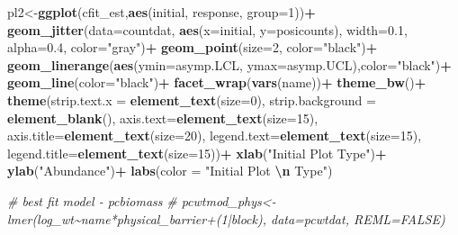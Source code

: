 \documentclass[
]{article}
\newenvironment{Shaded}{\begin{snugshade}}{\end{snugshade}}
\newcommand{\AttributeTok}[1]{\textcolor[rgb]{0.13,0.29,0.53}{#1}}
\newcommand{\CommentTok}[1]{\textcolor[rgb]{0.56,0.35,0.01}{\textit{#1}}}
\newcommand{\DecValTok}[1]{\textcolor[rgb]{0.00,0.00,0.81}{#1}}
\newcommand{\FloatTok}[1]{\textcolor[rgb]{0.00,0.00,0.81}{#1}}
\newcommand{\FunctionTok}[1]{\textcolor[rgb]{0.13,0.29,0.53}{\textbf{#1}}}
\newcommand{\NormalTok}[1]{#1}
\newcommand{\OtherTok}[1]{\textcolor[rgb]{0.56,0.35,0.01}{#1}}
\newcommand{\SpecialCharTok}[1]{\textcolor[rgb]{0.81,0.36,0.00}{\textbf{#1}}}
\newcommand{\StringTok}[1]{\textcolor[rgb]{0.31,0.60,0.02}{#1}}
\begin{document}
\begin{Shaded}
\begin{Highlighting}[]
\NormalTok{pl2}\OtherTok{\textless{}{-}}\FunctionTok{ggplot}\NormalTok{(cfit\_est,}\FunctionTok{aes}\NormalTok{(initial, response, }\AttributeTok{group=}\DecValTok{1}\NormalTok{))}\SpecialCharTok{+}
  \FunctionTok{geom\_jitter}\NormalTok{(}\AttributeTok{data=}\NormalTok{countdat,}
              \FunctionTok{aes}\NormalTok{(}\AttributeTok{x=}\NormalTok{initial, }\AttributeTok{y=}\NormalTok{posicounts),}
              \AttributeTok{width=}\FloatTok{0.1}\NormalTok{,}
              \AttributeTok{alpha=}\FloatTok{0.4}\NormalTok{,}
              \AttributeTok{color=}\StringTok{"gray"}\NormalTok{)}\SpecialCharTok{+}
  \FunctionTok{geom\_point}\NormalTok{(}\AttributeTok{size=}\DecValTok{2}\NormalTok{, }\AttributeTok{color=}\StringTok{"black"}\NormalTok{)}\SpecialCharTok{+}
  \FunctionTok{geom\_linerange}\NormalTok{(}\FunctionTok{aes}\NormalTok{(}\AttributeTok{ymin=}\NormalTok{asymp.LCL, }\AttributeTok{ymax=}\NormalTok{asymp.UCL),}\AttributeTok{color=}\StringTok{"black"}\NormalTok{)}\SpecialCharTok{+}
  \FunctionTok{geom\_line}\NormalTok{(}\AttributeTok{color=}\StringTok{"black"}\NormalTok{)}\SpecialCharTok{+}
  \FunctionTok{facet\_wrap}\NormalTok{(}\FunctionTok{vars}\NormalTok{(name))}\SpecialCharTok{+}
  \FunctionTok{theme\_bw}\NormalTok{()}\SpecialCharTok{+}
  \FunctionTok{theme}\NormalTok{(}\AttributeTok{strip.text.x =} \FunctionTok{element\_text}\NormalTok{(}\AttributeTok{size=}\DecValTok{0}\NormalTok{),}
        \AttributeTok{strip.background =} \FunctionTok{element\_blank}\NormalTok{(),}
        \AttributeTok{axis.text=}\FunctionTok{element\_text}\NormalTok{(}\AttributeTok{size=}\DecValTok{15}\NormalTok{),}
        \AttributeTok{axis.title=}\FunctionTok{element\_text}\NormalTok{(}\AttributeTok{size=}\DecValTok{20}\NormalTok{),}
        \AttributeTok{legend.text=}\FunctionTok{element\_text}\NormalTok{(}\AttributeTok{size=}\DecValTok{15}\NormalTok{),}
        \AttributeTok{legend.title=}\FunctionTok{element\_text}\NormalTok{(}\AttributeTok{size=}\DecValTok{15}\NormalTok{))}\SpecialCharTok{+}
  \FunctionTok{xlab}\NormalTok{(}\StringTok{"Initial Plot Type"}\NormalTok{)}\SpecialCharTok{+}
  \FunctionTok{ylab}\NormalTok{(}\StringTok{"Abundance"}\NormalTok{)}\SpecialCharTok{+}
  \FunctionTok{labs}\NormalTok{(}\AttributeTok{color =} \StringTok{"Initial Plot }\SpecialCharTok{\textbackslash{}n}\StringTok{ Type"}\NormalTok{)}

\CommentTok{\# best fit model {-} pcbiomass}
\CommentTok{\# pcwtmod\_phys\textless{}{-}lmer(log\_wt\textasciitilde{}name*physical\_barrier+(1|block), data=pcwtdat, REML=FALSE)}


\end{Highlighting}
\end{Shaded}
\end{document}
